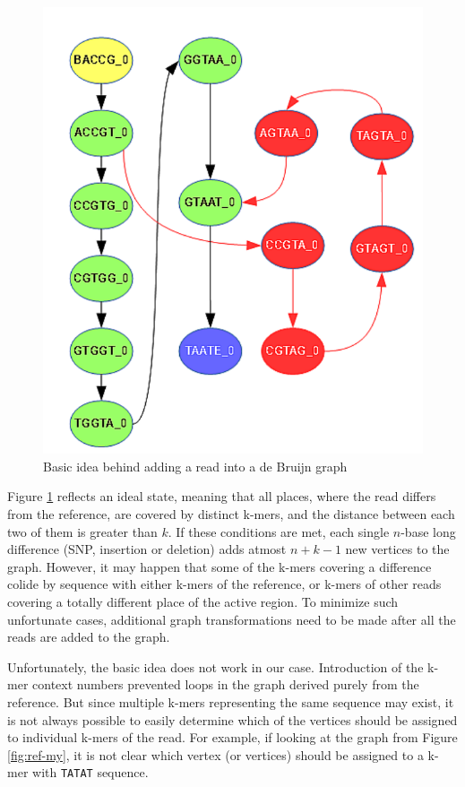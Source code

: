 \begin{figure}[h]
	\centering
	\includegraphics{img/read-idea.pdf}
	\caption{Basic idea behind adding a read into a de Bruijn graph}
	\label{fig:read-idea}
\end{figure}

Figure \ref{fig:read-idea} reflects an ideal state, meaning that all places, where the read differs from the reference, are covered by distinct k-mers, and the distance between each two of them is greater than $k$. If these conditions are met, each single $n$-base long difference (SNP, insertion or deletion) adds atmost $n+k-1$ new vertices to the graph. However, it may happen that some of the k-mers covering a difference colide by sequence with either k-mers of the reference, or k-mers of other reads covering a totally different place of the active region. To minimize such unfortunate cases, additional graph transformations need to be made after all the reads are added to the graph.

Unfortunately, the basic idea does not work in our case. Introduction of the k-mer context numbers prevented loops in the graph derived purely from the reference. But since multiple k-mers representing the same sequence may exist, it is not always possible to easily determine which of the vertices should be assigned to individual k-mers of the read. For example, if looking at the graph from Figure \ref{fig:ref-my}, it is not clear which vertex (or vertices) should be assigned to a k-mer with \texttt{TATAT} sequence. 

